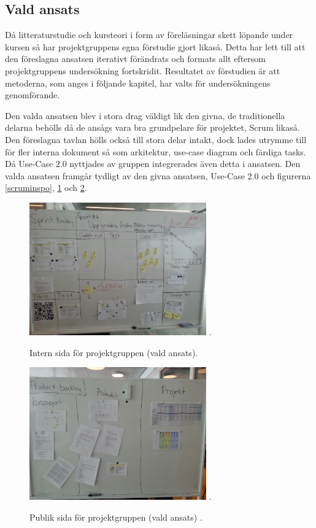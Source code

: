 \documentclass[conference,a4paper]{IEEEtran}
\begin{document}
\subsection{Vald ansats}
Då litteraturstudie och kursteori i form av föreläsningar skett löpande under kursen så har projektgruppens egna förstudie gjort likaså. Detta har lett till att den föreslagna ansatsen iterativt förändrats och formats allt eftersom projektgruppens undersökning fortskridit.
Resultatet av förstudien är att metoderna, som anges i följande kapitel, har valts för undersökningens genomförande.

Den valda ansatsen blev i stora drag väldigt lik den givna, de traditionella delarna behölls då de ansågs vara bra grundpelare för projektet, Scrum likaså. Den föreslagna tavlan hölls också till stora delar intakt, dock lades utrymme till för fler interna dokument så som arkitektur, use-case diagram och färdiga tasks. Då Use-Case 2.0 \cite{Jacobson11} nyttjades av gruppen integrerades även detta i ansatsen. Den valda ansatsen framgår tydligt av den givna ansatsen, Use-Case 2.0 och figurerna \ref{scruminspo}, \ref{varsprint} och \ref{varproduct}.

\begin{figure}[H]
\centering
\includegraphics[width=3in]{varsprint}
\DeclareGraphicsExtensions.
\caption{Intern sida för projektgruppen (vald ansats).}
\label{varsprint}
\end{figure}

\begin{figure}[H]
\centering
\includegraphics[width=3in]{varproduct}
\DeclareGraphicsExtensions.
\caption{Publik sida för projektgruppen (vald ansats) .}
\label{varproduct}
\end{figure}
\end{document}
